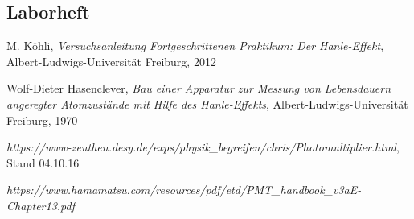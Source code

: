 \documentclass[12pt]{article}
\begin{document}
\subsection{Laborheft}

\newpage
\listoffigures


\newpage
\thispagestyle{empty}
\begin{thebibliography}{9}

  

  
  

M. Köhli,
\emph{Versuchsanleitung Fortgeschrittenen Praktikum: Der Hanle-Effekt},
Albert-Ludwigs-Universität Freiburg,
2012

Wolf-Dieter Hasenclever,
\emph{Bau einer Apparatur zur Messung von Lebensdauern angeregter Atomzustände mit Hilfe des Hanle-Effekts},
Albert-Ludwigs-Universität Freiburg,
1970

\emph{https://www-zeuthen.desy.de/exps/physik\_begreifen/chris/Photomultiplier.html}, Stand 04.10.16

\emph{https://www.hamamatsu.com/resources/pdf/etd/PMT\_handbook\_v3aE-Chapter13.pdf}
\end{thebibliography}
\end{document}
